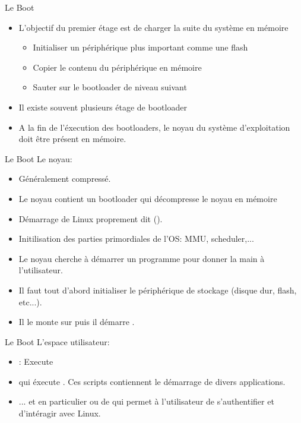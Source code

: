 \begin{frame}[fragile=singleslide]{Le Boot}
  \begin{itemize}
  \item L'objectif du premier étage est de charger la suite du système
    en mémoire
    \begin{itemize}
    \item Initialiser un périphérique plus important comme une flash
    \item Copier le contenu du périphérique en mémoire
    \item Sauter sur le bootloader de niveau suivant
    \end{itemize}
  \item Il existe souvent plusieurs étage de bootloader
  \item A la  fin de l'éxecution des bootloaders,  le noyau du système
    d'exploitation doit être présent en mémoire.
  \end{itemize}
\end{frame}

\begin{frame}[fragile=singleslide]{Le Boot}
  Le noyau:
  \begin{itemize}
  \item Généralement compressé.
  \item Le  noyau contient un  bootloader qui décompresse le  noyau en
    mémoire
  \item       Démarrage       de       Linux      proprement       dit
    ().
  \item   Initilisation  des  parties   primordiales  de   l'OS:  MMU,
    scheduler,...
  \item Le noyau cherche à démarrer un programme pour donner la main à
    l'utilisateur.
  \item Il  faut tout d'abord initialiser le  périphérique de stockage
    (disque dur, flash, etc...).
  \item Il le monte sur \file{/} puis il démarre .
  \end{itemize}
\end{frame}

\begin{frame}[fragile=singleslide]{Le Boot}
  L'espace utilisateur:
  \begin{itemize}
  \item {}:  Execute 
  \item qui  éxecute .  Ces  scripts contiennent le
    démarrage de divers applications.
  \item  ...  et  en  particulier   ou  de   qui
    permet  à  l'utilisateur  de  s'authentifier et  d'intéragir  avec
    Linux.
  \end{itemize}
\end{frame}

